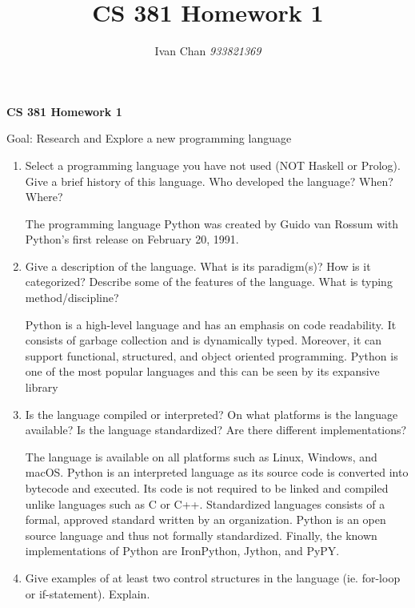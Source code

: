 \documentclass[12pt, letterpaper]{article}
\title{CS 381 Homework 1}
\author{Ivan Chan \textit{933821369}}
\begin{document}
  
\textbf{CS 381 Homework 1}

Goal: Research and Explore a new programming language

\begin{enumerate}
  \item Select a programming language you have not used (NOT Haskell or Prolog). Give a brief history of this
  language. Who developed the language? When? Where?
    
  The programming language Python was created by Guido van Rossum with Python's first release on February 20, 1991.

  \item Give a description of the language. What is its paradigm(s)? How is it categorized? Describe some of
  the features of the language. What is typing method/discipline?
  
  Python is a high-level language and has an emphasis on code readability. It consists of garbage collection and is dynamically typed.
  Moreover, it can support functional, structured, and object oriented programming. Python is one of the most popular languages and this can be seen by its expansive library

  \item Is the language compiled or interpreted? On what platforms is the language available? Is the
  language standardized? Are there different implementations?

  The language is available on all platforms such as Linux, Windows, and macOS. Python is an interpreted language as its source code is converted into bytecode and executed.
  Its code is not required to be linked and compiled unlike languages such as C or C++.
  Standardized languages consists of a formal, approved standard written by an organization. Python is an open source language and thus not formally standardized.
  Finally, the known implementations of Python are IronPython, Jython, and PyPY.

  \item  Give examples of at least two control structures in the language (ie. for-loop or if-statement). Explain.
  

\end{enumerate}
\end{document}
